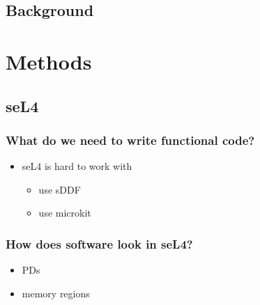 \documentclass{beamer}
\begin{document}
\subsection{Background}

\section{Methods}
\subsection{seL4}
\begin{frame}
    \frametitle{What do we need to write functional code?}
    \begin{itemize}
        \item seL4 is hard to work with
            \begin{itemize}
                \item use sDDF
                \item use microkit
            \end{itemize}
    \end{itemize}
\end{frame}
\begin{frame}
    \frametitle{How does software look in seL4?}
    \begin{itemize}
        \item PDs
        \item memory regions
    \end{itemize}
\end{frame}
\end{document}
